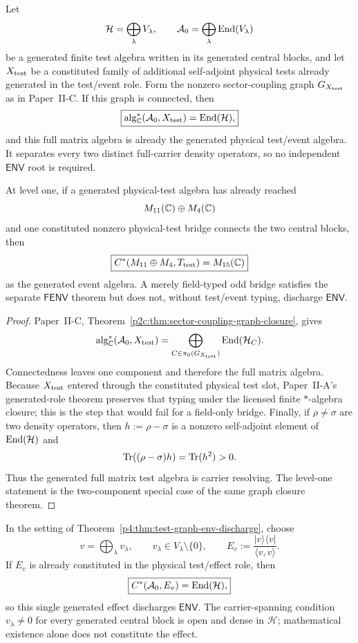 \documentclass[12pt,a4paper]{article}
\begin{document}
\begin{theorem}
\label{p4:thm:test-graph-env-discharge}
Let
\[
 \mathcal H=\bigoplus_{\lambda}V_\lambda,
 \qquad
 \mathcal A_0=\bigoplus_{\lambda}\operatorname{End}(V_\lambda)
\]
be a generated finite test algebra written in its generated central blocks,
and let \(X_{\rm test}\) be a constituted family of additional self-adjoint
physical tests already generated in the test/event role.  Form the nonzero
sector-coupling graph \(G_{X_{\rm test}}\) as in Paper~II-C.  If this graph is
connected, then
\[
 \boxed{
 \operatorname{alg}_{\mathbb{C}}^{*}(\mathcal A_0,X_{\rm test})
 =\operatorname{End}(\mathcal H),
 }
\]
and this full matrix algebra is already the generated physical test/event
algebra.  It separates every two distinct full-carrier density operators, so
no independent \(\mathsf{ENV}\) root is required.

At level one, if a generated physical-test algebra has already reached
\[
 M_{11}(\mathbb{C})\oplus M_4(\mathbb{C})
\]
and one constituted nonzero physical-test bridge connects the two central
blocks, then
\[
 \boxed{C^*(M_{11}\oplus M_4,T_{\rm test})=M_{15}(\mathbb{C})}
\]
as the generated event algebra.  A merely field-typed odd bridge satisfies the
separate \(\mathsf{FENV}\) theorem but does not, without test/event typing,
discharge \(\mathsf{ENV}\).
\end{theorem}

\begin{proof}
Paper~II-C, Theorem~\ref{p2c:thm:sector-coupling-graph-closure}, gives
\[
 \operatorname{alg}_{\mathbb{C}}^{*}(\mathcal A_0,X_{\rm test})
 =\bigoplus_{C\in\pi_0(G_{X_{\rm test}})}\operatorname{End}(\mathcal H_C).
\]
Connectedness leaves one component and therefore the full matrix algebra.
Because \(X_{\rm test}\) entered through the constituted physical test slot,
Paper~II-A's generated-role theorem preserves that typing under the licensed
finite \(*\)-algebra closure; this is the step that would fail for a
field-only bridge.  Finally, if \(\rho\ne\sigma\) are two density operators,
then \(h:=\rho-\sigma\) is a nonzero self-adjoint element of
\(\operatorname{End}(\mathcal H)\) and
\[
 \operatorname{Tr}((\rho-\sigma)h)=\operatorname{Tr}(h^2)>0.
\]
Thus the generated full matrix test algebra is carrier resolving.  The
level-one statement is the two-component special case of the same graph
closure theorem.
\end{proof}

\begin{corollary}
\label{p4:cor:one-effect-env-discharge}
In the setting of
Theorem~\ref{p4:thm:test-graph-env-discharge}, choose
\[
 v=\bigoplus_\lambda v_\lambda,
 \qquad v_\lambda\in V_\lambda\setminus\{0\},
 \qquad
 E_v:=\frac{\lvert v\rangle\langle v\rvert}{\langle v,v\rangle}.
\]
If \(E_v\) is already constituted in the physical test/effect role, then
\[
 \boxed{C^*(\mathcal A_0,E_v)=\operatorname{End}(\mathcal H),}
\]
so this single generated effect discharges \(\mathsf{ENV}\).  The
carrier-spanning condition \(v_\lambda\ne0\) for every generated central
block is open and dense in \(\mathcal H\); mathematical existence alone does
not constitute the effect.
\end{corollary}
\end{document}
